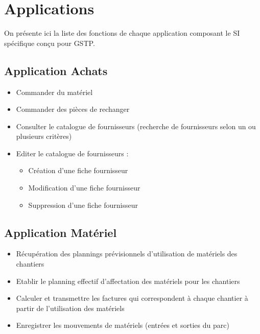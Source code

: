 \documentclass [a4paper] {report}
\begin{document}
\section{Applications}

On présente ici la liste des fonctions de chaque application composant le
SI spécifique conçu pour GSTP.


\subsection{Application Achats}

\begin{itemize}
\item Commander du matériel
\item Commander des pièces de rechanger
\item Consulter le catalogue de fournisseurs (recherche de fournisseurs selon 
un ou plusieurs critères)
\item Editer le catalogue de fournisseurs :
	\begin{itemize}
	\item Création d'une fiche fournisseur
	\item Modification d'une fiche fournisseur
	\item Suppression d'une fiche fournisseur
	\end{itemize}
\end{itemize}

\subsection{Application Matériel}
\begin{itemize}
\item Récupération des plannings prévisionnels d'utilisation de matériels des chantiers
\item Etablir le planning effectif d'affectation des matériels pour les chantiers
\item Calculer et transmettre les factures qui correspondent à chaque chantier
à partir de l'utilisation des matériels
\item Enregistrer les mouvements de matériels (entrées et sorties du parc)
\end{itemize}
\end{document}
